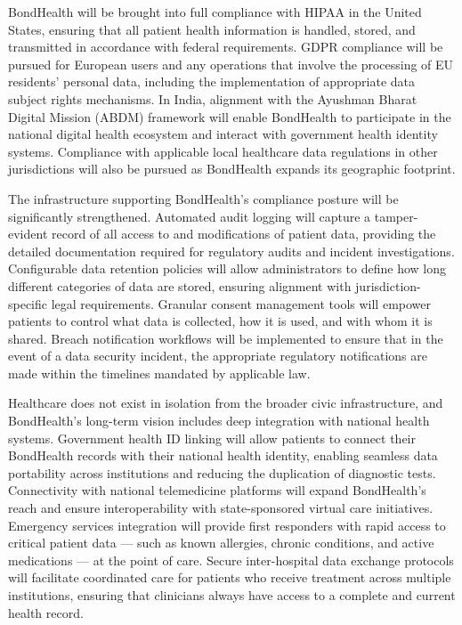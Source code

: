 \noindent BondHealth will be brought into full compliance with HIPAA in the United States, ensuring that all patient health information is handled, stored, and transmitted in accordance with federal requirements. GDPR compliance will be pursued for European users and any operations that involve the processing of EU residents' personal data, including the implementation of appropriate data subject rights mechanisms. In India, alignment with the Ayushman Bharat Digital Mission (ABDM) framework will enable BondHealth to participate in the national digital health ecosystem and interact with government health identity systems. Compliance with applicable local healthcare data regulations in other jurisdictions will also be pursued as BondHealth expands its geographic footprint.

\noindent The infrastructure supporting BondHealth's compliance posture will be significantly strengthened. Automated audit logging will capture a tamper-evident record of all access to and modifications of patient data, providing the detailed documentation required for regulatory audits and incident investigations. Configurable data retention policies will allow administrators to define how long different categories of data are stored, ensuring alignment with jurisdiction-specific legal requirements. Granular consent management tools will empower patients to control what data is collected, how it is used, and with whom it is shared. Breach notification workflows will be implemented to ensure that in the event of a data security incident, the appropriate regulatory notifications are made within the timelines mandated by applicable law.

\noindent Healthcare does not exist in isolation from the broader civic infrastructure, and BondHealth's long-term vision includes deep integration with national health systems. Government health ID linking will allow patients to connect their BondHealth records with their national health identity, enabling seamless data portability across institutions and reducing the duplication of diagnostic tests. Connectivity with national telemedicine platforms will expand BondHealth's reach and ensure interoperability with state-sponsored virtual care initiatives. Emergency services integration will provide first responders with rapid access to critical patient data --- such as known allergies, chronic conditions, and active medications --- at the point of care. Secure inter-hospital data exchange protocols will facilitate coordinated care for patients who receive treatment across multiple institutions, ensuring that clinicians always have access to a complete and current health record.

